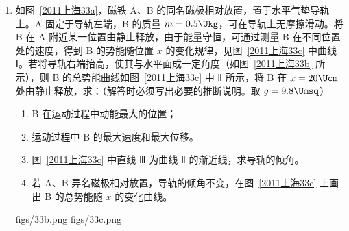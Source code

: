 \documentclass[\gkver]{gaokaozhenti}
\begin{document}
\begin{enumerate}
{$mg\sin 30^{\circ} - \frac{B^{2}L^{2}v}{R + r} = ma$

上式表明，加速度随速度增加而减小，棒做加速度减小的加速运动。无论最终是否达到匀速，当棒到达斜面底端时速度一定为最大。由动能定理可以得到棒的末速度，因此上述解法正确。

$mgs\sin 30^{\circ} - Q = \frac{1}{2}mv_{m}^{2}$

解得 $v_{m} = \sqrt{2gs\sin 30^{\circ} - \frac{2Q}{m}} = \sqrt{2 \times 10 \times 1.15 \times 0.5 - \frac{2 \times 0.4}{0.2}}\Ums = 2.74\Ums$。
}

\item
如图~\ref{2011上海33a}，磁铁 A、B 的同名磁极相对放置，置于水平气垫导轨上。A 固定于导轨左端，B 的质量 $m = 0.5\Ukg$，可在导轨上无摩擦滑动。将 B 在 A 附近某一位置由静止释放，由于能量守恒，可通过测量 B 在不同位置处的速度，得到 B 的势能随位置 $x$ 的变化规律，见图~\ref{2011上海33c} 中曲线 Ⅰ。若将导轨右端抬高，使其与水平面成一定角度（如图~\ref{2011上海33b} 所示），则 B 的总势能曲线如图~\ref{2011上海33c} 中 Ⅱ 所示，将 B 在 $x = 20\Ucm$ 处由静止释放，求：（解答时必须写出必要的推断说明。取 $g = 9.8\Umsq$）
\begin{enumerate}
	\item
	B 在运动过程中动能最大的位置；
	\item
	运动过程中 B 的最大速度和最大位移。
	\item
	图~\ref{2011上海33c} 中直线 Ⅲ 为曲线 Ⅱ 的渐近线，求导轨的倾角。
	\item
	若 A、B 异名磁极相对放置，导轨的倾角不变，在图~\ref{2011上海33c} 上画出 B 的总势能随 $x$ 的变化曲线。
\end{enumerate}
{figs/33b.png}
{figs/33c.png}
\end{enumerate}
\end{document}
